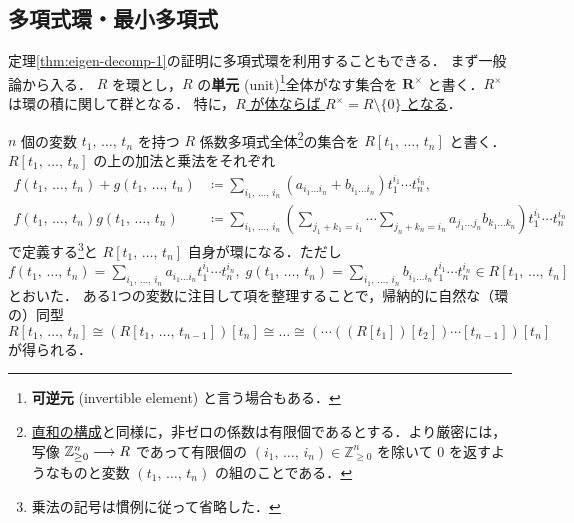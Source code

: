 \documentclass[rep_main]{subfiles}
\begin{document}
\subsection{多項式環・最小多項式}

定理\ref{thm:eigen-decomp-1}の証明に多項式環を利用することもできる．
まず一般論から入る．
$R$ を環とし，$R$ の\textbf{単元} (unit)\footnote{\textbf{可逆元} (invertible element) と言う場合もある．}全体がなす集合を $\bm{R^\times}$ と書く．$R^\times$ は環の積に関して群となる．
特に，\underline{$R$ が体ならば $R^\times = R \setminus \{0\}$ となる}．

$n$ 個の変数 $t_1,\, \dots,\, t_n$ を持つ $R$ 係数多項式全体\footnote{\hyperref[prop:sum-vec]{直和の構成}と同様に，非ゼロの係数は有限個であるとする．より厳密には，写像 $\mathbb{Z}_{\ge 0}^n \longrightarrow R$ であって有限個の $(i_1,\, \dots,\, i_n) \in \mathbb{Z}_{\ge 0}^n$ を除いて $0$ を返すようなものと変数 $(t_1,\, \dots,\, t_n)$ の組のことである．}の集合を $R[t_1,\, \dots,\, t_n]$ と書く．
$R[t_1,\, \dots,\, t_n]$ の上の加法と乗法をそれぞれ
\begin{align}
    f(t_1,\, \dots,\, t_n) + g(t_1,\, \dots,\, t_n)  &\coloneqq \sum_{i_1,\, \dots,\, i_n}(a_{i_1\dots i_n} + b_{i_1\dots i_n}) t_1^{i_1} \cdots t_n^{i_n}, \\
    f(t_1,\, \dots,\, t_n) g(t_1,\, \dots,\, t_n) &\coloneqq \sum_{i_1,\, \dots,\, i_n}\left(\sum_{j_1 + k_1 = i_1} \cdots \sum_{j_n + k_n = i_n}a_{j_1\dots j_n}b_{k_1\dots k_n}\right) t_1^{i_1} \cdots t_n^{i_n}
\end{align}
で定義する\footnote{乗法の記号は慣例に従って省略した．}と $R[t_1,\, \dots,\, t_n]$ 自身が環になる．ただし $f(t_1,\, \dots,\, t_n) = \sum_{i_1,\, \dots,\, i_n} a_{i_1\dots i_n} t_1^{i_1} \cdots t_n^{i_n},\; g(t_1,\, \dots,\, t_n) = \sum_{i_1,\, \dots,\, i_n} b_{i_1\dots i_n} t_1^{i_1} \cdots t_n^{i_n} \in R[t_1,\, \dots,\, t_n]$ とおいた．
ある1つの変数に注目して項を整理することで，帰納的に自然な（環の）同型 $R[t_1,\, \dots,\, t_n] \cong (R[t_1,\, \dots,\, t_{n-1}])[t_n] \cong \dots \cong (\cdots((R[t_1])[t_2])\cdots [t_{n-1}])[t_n]$ が得られる．
\end{document}
